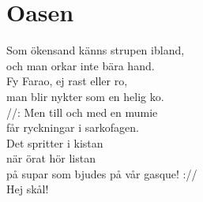 \section{Oasen}
Som ökensand känns strupen ibland,\\
och man orkar inte bära hand.\\
Fy Farao, ej rast eller ro,\\
man blir nykter som en helig ko.\\

//: Men till och med en mumie\\
får ryckningar i sarkofagen.\\
Det spritter i kistan\\
när örat hör listan\\
på supar som bjudes på vår gasque! ://\\
Hej skål!\\